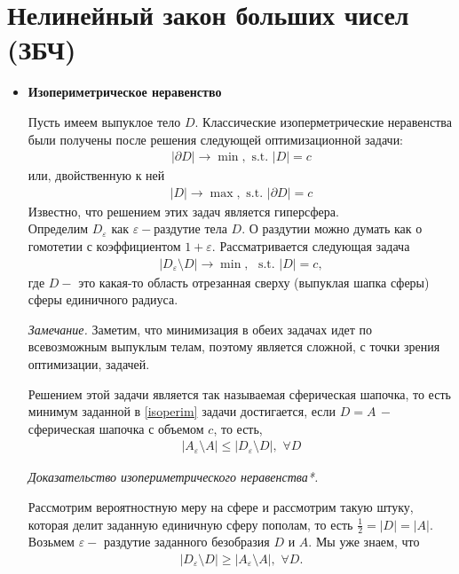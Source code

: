 \documentclass[12pt]{article}
\begin{document}
\section{Нелинейный закон больших чисел (ЗБЧ)}
\begin{itemize}
\item {\bf Изопериметрическое неравенство}
\par Пусть имеем выпуклое тело $D$. Классические изоперметрические неравенства были получены после решения следующей оптимизационной задачи:
\begin{eqnarray}
|\partial D| \to \min, \,\, \text{s.t. }|D| = c
\end{eqnarray}
или, двойственную к ней 
\begin{eqnarray}
|D| \to \max, \,\, \text{s.t. } |\partial D| = c
\end{eqnarray}
Известно, что решением этих задач является гиперсфера. \\
Определим $D_{\varepsilon}$ как $\varepsilon-$раздутие тела $D$. О раздутии можно думать как о гомотетии с коэффициентом $1 + \varepsilon$. Рассматривается следующая задача
\begin{eqnarray}\label{isoperim}
|D_{\varepsilon} \setminus D| \to \min, \,\, \text{ s.t. } |D| = c,
\end{eqnarray}
где $D-$ это какая-то область отрезанная сверху (выпуклая шапка сферы) сферы единичного радиуса. 
\par {\it Замечание.} Заметим, что минимизация в обеих задачах идет по всевозможным выпуклым телам, поэтому является сложной, с точки зрения оптимизации, задачей. 
\par Решением этой задачи является так называемая сферическая шапочка, то есть минимум заданной в \eqref{isoperim} задачи достигается, если $D = A\, -$ сферическая шапочка с объемом $c$, то есть, 
\begin{eqnarray}
| A_{\varepsilon}\setminus A | \le |D_{\varepsilon}\setminus D|, \,\, \forall D
\end{eqnarray}
\par {\it Доказательство изопериметрического неравенства*.} 
\par Рассмотрим вероятностную меру на сфере и рассмотрим такую штуку, которая делит заданную единичную сферу пополам, то есть $\frac 1 2 = | D | = | A |$. Возьмем $\varepsilon-$ раздутие заданного безобразия $D$ и $A$. Мы уже знаем, что 
\begin{eqnarray}
| D_{\varepsilon}\setminus D | \ge |A_{\varepsilon}\setminus A|, \,\, \forall D.

\end{eqnarray}
\end{itemize}
\end{document}
